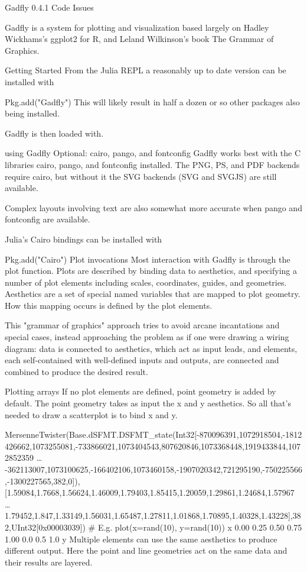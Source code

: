Gadfly 0.4.1
 Code Issues

Gadfly is a system for plotting and visualization based largely on Hadley Wickhams's ggplot2 for R, and Leland Wilkinson's book The Grammar of Graphics.

Getting Started
From the Julia REPL a reasonably up to date version can be installed with

Pkg.add("Gadfly")
This will likely result in half a dozen or so other packages also being installed.

Gadfly is then loaded with.

using Gadfly
Optional: cairo, pango, and fontconfig
Gadfly works best with the C libraries cairo, pango, and fontconfig installed. The PNG, PS, and PDF backends require cairo, but without it the SVG backends (SVG and SVGJS) are still available.

Complex layouts involving text are also somewhat more accurate when pango and fontconfig are available.

Julia's Cairo bindings can be installed with

Pkg.add("Cairo")
Plot invocations
Most interaction with Gadfly is through the plot function. Plots are described by binding data to aesthetics, and specifying a number of plot elements including scales, coordinates, guides, and geometries. Aesthetics are a set of special named variables that are mapped to plot geometry. How this mapping occurs is defined by the plot elements.

This "grammar of graphics" approach tries to avoid arcane incantations and special cases, instead approaching the problem as if one were drawing a wiring diagram: data is connected to aesthetics, which act as input leads, and elements, each self-contained with well-defined inputs and outputs, are connected and combined to produce the desired result.

Plotting arrays
If no plot elements are defined, point geometry is added by default. The point geometry takes as input the x and y aesthetics. So all that's needed to draw a scatterplot is to bind x and y.

MersenneTwister(Base.dSFMT.DSFMT_state(Int32[-870096391,1072918504,-1812426662,1073255081,-733866021,1073404543,807620846,1073368448,1919433844,1072852359  …  -362113007,1073100625,-166402106,1073460158,-1907020342,721295190,-750225566,-1300227565,382,0]),[1.59084,1.7668,1.56624,1.46009,1.79403,1.85415,1.20059,1.29861,1.24684,1.57967  …  1.79452,1.847,1.33149,1.56031,1.65487,1.27811,1.01868,1.70895,1.40328,1.43228],382,UInt32[0x00003039])
# E.g.
plot(x=rand(10), y=rand(10))
x
0.00
0.25
0.50
0.75
1.00
0.0
0.5
1.0
y
Multiple elements can use the same aesthetics to produce different output. Here the point and line geometries act on the same data and their results are layered.

